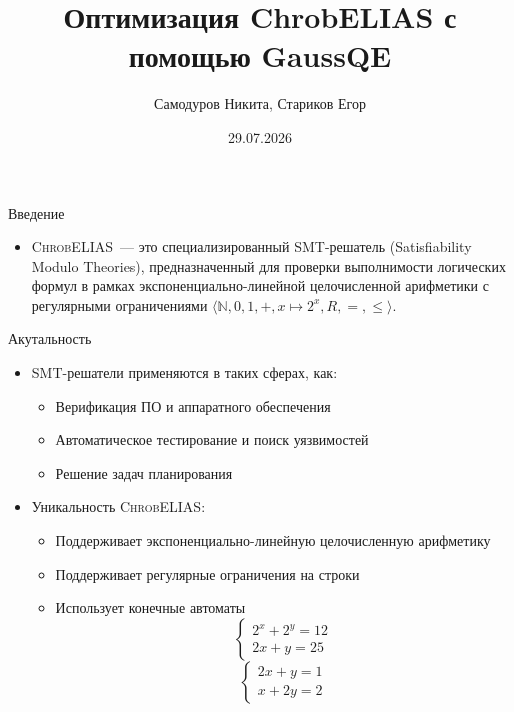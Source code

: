 \documentclass{beamer}
\title[GaussQE]{Оптимизация ChrobELIAS с помощью GaussQE}
\author[Самодуров Н., Стариков Е.]{Самодуров Никита, Стариков Егор}
\institute[]{
  Научный руководитель: Белянин Георгий \\
  СПбГУ
}
\date{29.07.2026}
\newcommand{\chro}{\textsc{ChrobELIAS}\xspace}
\begin{document}
\maketitle

\begin{frame}{Введение}
    \begin{itemize}
      \item \chro ~--- это специализированный SMT-решатель (Satisfiability Modulo Theories), предназначенный для проверки выполнимости логических формул в рамках экспоненциально-линейной целочисленной арифметики с регулярными ограничениями $\langle \mathbb{N}, 0, 1, +, x \mapsto 2^x, R, =, \leq \rangle$.
    \end{itemize}
\end{frame}

\begin{frame}{Акутальность}
    \begin{itemize}
        \item SMT-решатели применяются в таких сферах, как: 
        \begin{itemize}
            \item Верификация ПО и аппаратного обеспечения
            \item Автоматическое тестирование и поиск уязвимостей
            \item Решение задач планирования
        \end{itemize}
        \item Уникальность \chro:
        \begin{itemize}
            \item Поддерживает экспоненциально-линейную целочисленную арифметику
            \item Поддерживает регулярные ограничения на строки
            \item Использует конечные автоматы
            \[
            \begin{cases}
            2^x + 2^y = 12 \\
            2x + y = 25
            \end{cases}
            \]
            \[
            \begin{cases}
            2x + y = 1 \\
            x + 2y = 2
            \end{cases}
            \]
        \end{itemize}
    \end{itemize}
\end{frame}
\end{document}
